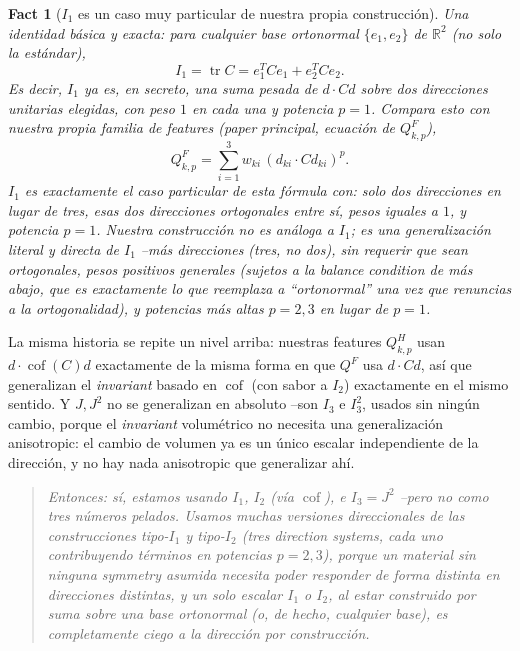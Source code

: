 \documentclass[11pt,a4paper]{article}
\newtheorem{fact}{Fact}
\newcommand{\Cof}{\operatorname{cof}}
\newcommand{\tr}{\operatorname{tr}}
\newcommand{\R}{\mathbb{R}}
\newenvironment{takeaway}
 {\begin{quote}\small\itshape\color{blue!60!black}}
 {\end{quote}}
\begin{document}
\begin{fact}[$I_1$ es un caso muy particular de nuestra propia construcci\'on]
\label{fact:i1-special-case}
Una identidad b\'asica y exacta: para \emph{cualquier} base ortonormal
$\{e_1,e_2\}$ de $\R^2$ (no solo la est\'andar),
\[
 I_1=\tr C = e_1^TCe_1+e_2^TCe_2 .
\]
Es decir, $I_1$ ya es, en secreto, una suma pesada de $d\cdot Cd$ sobre
dos direcciones unitarias elegidas, con peso $1$ en cada una y potencia
$p=1$. Compara esto con nuestra propia familia de features (paper
principal, ecuaci\'on de $Q^F_{k,p}$),
\[
 Q_{k,p}^F=\sum_{i=1}^3 w_{ki}\,(d_{ki}\cdot Cd_{ki})^p .
\]
$I_1$ es exactamente el caso particular de esta f\'ormula con: solo
\emph{dos} direcciones en lugar de tres, esas dos direcciones
\emph{ortogonales} entre s\'i, pesos \emph{iguales} a $1$, y potencia
$p=1$. Nuestra construcci\'on no es an\'aloga a $I_1$; es una
generalizaci\'on literal y directa de $I_1$ --m\'as direcciones (tres,
no dos), sin requerir que sean ortogonales, pesos positivos generales
(sujetos a la \emph{balance condition} de m\'as abajo, que es
exactamente lo que reemplaza a ``ortonormal'' una vez que renuncias a
la ortogonalidad), y potencias m\'as altas $p=2,3$ en lugar de $p=1$.
\end{fact}

La misma historia se repite un nivel arriba: nuestras features
$Q_{k,p}^H$ usan $d\cdot\Cof(C)d$ exactamente de la misma forma en que
$Q^F$ usa $d\cdot Cd$, as\'i que generalizan el \emph{invariant} basado
en $\Cof$ (con sabor a $I_2$) exactamente en el mismo sentido. Y $J,J^2$
no se generalizan en absoluto --son $I_3$ e $I_3^2$, usados sin ning\'un
cambio, porque el \emph{invariant} volum\'etrico no necesita una
generalizaci\'on anisotropic: el cambio de volumen ya es un \'unico
escalar independiente de la direcci\'on, y no hay nada anisotropic que
generalizar ah\'i.

\begin{takeaway}
Entonces: s\'i, estamos usando $I_1$, $I_2$ (v\'ia $\Cof$), e $I_3=J^2$
--pero no como tres n\'umeros pelados. Usamos \emph{muchas} versiones
direccionales de las construcciones tipo-$I_1$ y tipo-$I_2$ (tres
direction systems, cada uno contribuyendo t\'erminos en potencias
$p=2,3$), porque un material \emph{sin ninguna symmetry asumida}
necesita poder responder de forma distinta en direcciones distintas, y
un solo escalar $I_1$ o $I_2$, al estar construido por suma sobre una
base ortonormal (o, de hecho, \emph{cualquier} base), es completamente
ciego a la direcci\'on por construcci\'on.
\end{takeaway}
\end{document}
